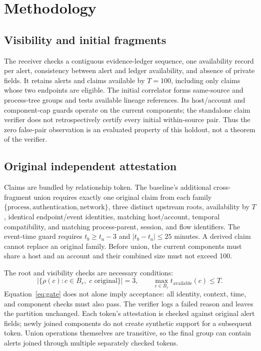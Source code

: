 \section{Methodology}\label{sec:method}
\subsection{Visibility and initial fragments}
The receiver checks a contiguous evidence-ledger sequence, one availability record per alert, consistency between alert and ledger availability, and absence of private fields. It retains alerts and claims available by $T=100$, including only claims whose two endpoints are eligible. The initial correlator forms same-source and process-tree groups and tests available lineage references. Its host/account and component-cap guards operate on the current components; the standalone claim verifier does not retrospectively certify every initial within-source pair. Thus the zero false-pair observation is an evaluated property of this holdout, not a theorem of the verifier.

\subsection{Original independent attestation}
Claims are bundled by relationship token. The baseline's additional cross-fragment union requires exactly one original claim from each family $\{\mathrm{process},\mathrm{authentication},\mathrm{network}\}$, three distinct upstream roots, availability by $T$, identical endpoint/event identities, matching host/account, temporal compatibility, and matching process-parent, session, and flow identifiers. The event-time guard requires $t_b\geq t_a-3$ and $|t_b-t_a|\leq25$ minutes. A derived claim cannot replace an original family. Before union, the current components must share a host and an account and their combined size must not exceed 100.

The root and visibility checks are necessary conditions:
\begin{equation}\label{eq:gate}
\left|\{\rho(c):c\in B_r,\;c\text{ original}\}\right|=3,\qquad
\max_{c\in B_r}t_{\mathrm{available}}(c)\leq T.
\end{equation}
Equation~\ref{eq:gate} does not alone imply acceptance: all identity, context, time, and component checks must also pass. The verifier logs a failed reason and leaves the partition unchanged. Each token's attestation is checked against original alert fields; newly joined components do not create synthetic support for a subsequent token. Union operations themselves are transitive, so the final group can contain alerts joined through multiple separately checked tokens.

